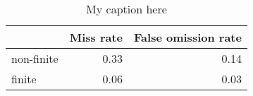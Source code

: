 \begin{table}[!ht]
\centering
\begin{tabular}{lrr}
\toprule
{} &  Miss rate &  False omission rate \\
\midrule
non-finite &       0.33 &                 0.14 \\
finite     &       0.06 &                 0.03 \\
\bottomrule
\end{tabular}
\caption{My caption here}
\label{tab:FINITENESS-ocd-combined-errors}
\end{table}